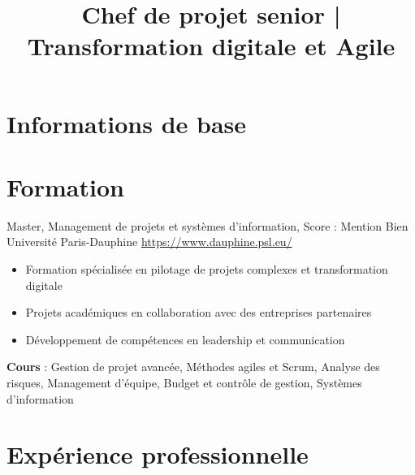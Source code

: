 \documentclass[a4paper, serif, 10pt]{moderncv}
\title{Chef de projet senior | Transformation digitale et Agile}
\begin{document}
\maketitle

\section{Informations de base}

\section{Formation}

        {Master, Management de projets et systèmes d'information, Score : Mention Bien}
        {Université Paris-Dauphine}
        {\url{https://www.dauphine.psl.eu/}}
        {}
        {\begin{itemize}
\item Formation spécialisée en pilotage de projets complexes et transformation digitale
\item Projets académiques en collaboration avec des entreprises partenaires
\item Développement de compétences en leadership et communication
\end{itemize}
\textbf{Cours} : Gestion de projet avancée, Méthodes agiles et Scrum, Analyse des risques, Management d'équipe, Budget et contrôle de gestion, Systèmes d'information}
\section{Expérience professionnelle}
\end{document}
